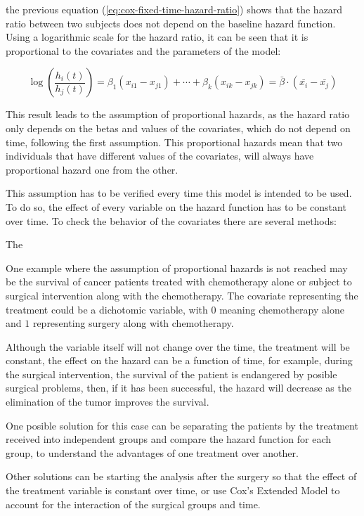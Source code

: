 \documentclass[11pt]{book} %
\begin{document}
      the previous equation (\ref{eq:cox-fixed-time-hazard-ratio}) shows that the hazard ratio between two subjects does not depend on the baseline hazard function. Using a logarithmic scale for the hazard ratio, it can be seen that it is proportional to the covariates and the parameters of the model:

      \begin{equation}
        \log(\frac{h_i(t)}{h_j(t)}) = \beta_1(x_{i1} - x_{j1}) + \cdots + \beta_k(x_{ik} - x_{jk}) =
        \bar{\beta}\cdot(\bar{x_i}-\bar{x_j})
      \end{equation}

      This result leads to the assumption of proportional hazards, as the hazard ratio only depends on the betas and values of the covariates, which do not depend on time, following the first assumption. This proportional hazards mean that two individuals that have different values of the covariates, will always have proportional hazard one from the other.

      This assumption has to be verified every time this model is intended to be used. To do so, the effect of every variable on the hazard function has to be constant over time. To check the behavior of the covariates there are several methods:

      The



      One example where the assumption of proportional hazards is not reached may be the survival of cancer patients treated with chemotherapy alone or subject to surgical intervention along with the chemotherapy. The covariate representing the treatment could be a dichotomic variable, with $0$ meaning chemotherapy alone and $1$ representing surgery along with chemotherapy.

      Although the variable itself will not change over the time, the treatment will be constant, the effect on the hazard can be a function of time, for example, during the surgical intervention, the survival of the patient is endangered by posible surgical problems, then, if it has been successful, the hazard will decrease as the elimination of the tumor improves the survival.

      One posible solution for this case can be separating the patients by the treatment received into independent groups and compare the hazard function for each group, to understand the advantages of one treatment over another.

      Other solutions can be starting the analysis after the surgery so that the effect of the treatment variable is constant over time, or use Cox's Extended Model to account for the interaction of the surgical groups and time.
\end{document}
